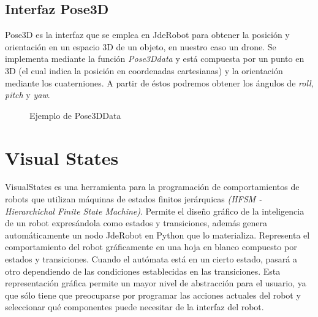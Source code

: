 \subsection{Interfaz Pose3D}
\hspace{1cm} Pose3D es la interfaz que se emplea en JdeRobot para obtener la posición y orientación en un espacio 3D de un objeto, en nuestro caso un drone. Se implementa mediante la función \emph{Pose3Ddata} y está compuesta por un punto en 3D (el cual indica la posición en coordenadas cartesianas) y la orientación mediante los cuaterniones. A partir de éstos podremos obtener los ángulos de \textit{roll, pitch} y \textit{yaw}.

\begin{figure}[H]
 \centering
 \caption{Ejemplo de Pose3DData}
 \label{f:Ejemplo de Pose3DData}
\end{figure} 

\section{Visual States}
\hspace{1cm} VisualStates es una herramienta para la programación de comportamientos de robots que utilizan máquinas de estados finitos jerárquicas \textit{(HFSM - Hierarchichal Finite State Machine)}. Permite el diseño gráfico de la inteligencia de un robot expresándola como estados y transiciones, además genera automáticamente un nodo JdeRobot en Python que lo materializa. Representa el comportamiento del robot gráficamente en una hoja en blanco compuesto por estados y transiciones. Cuando el autómata está en un cierto estado, pasará a otro dependiendo de las condiciones establecidas en las transiciones. Esta representación gráfica permite un mayor nivel de abstracción para el usuario, ya que sólo tiene que preocuparse por programar las acciones actuales del robot y seleccionar qué componentes puede necesitar de la interfaz del robot.

